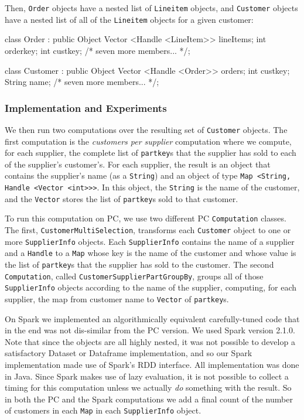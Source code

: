 \noindent Then,
\texttt{Order} objects have a nested list of \texttt{Lineitem} objects, and \texttt{Customer} objects have a nested
list of all of the
\texttt{Lineitem} objects for a given customer:

\begin{codesmall}
class Order : public Object {
   Vector <Handle <LineItem>> lineItems;
   int orderkey;
   int custkey;
   /* seven more members... */};

class Customer : public Object {
   Vector <Handle <Order>> orders;
   int custkey;
   String name;
   /* seven more members... */};
\end{codesmall}

\subsubsection{Implementation and Experiments}
We then run two computations over the resulting set of \texttt{Customer} objects.  
The first computation is the \emph{customers per supplier} computation where we
compute, for each supplier,
the complete list of \texttt{partkey}s that the supplier has sold to each of the supplier's customer's.
For each supplier, the result is an object that contains the supplier's name (as a \texttt{String}) and
an object of type \texttt{Map <String, Handle <Vector <int}\texttt{>}\texttt{>}\texttt{>}.  In this
object, the \texttt{String} is the name of the customer, and the \texttt{Vector} stores the list of
\texttt{partkey}s sold to that customer.

To run this computation on PC, we use two different PC \texttt{Computation} classes.  The first, 
\texttt{Customer}\-\texttt{MultiSelection}, transforms each 
\texttt{Customer} object to one or more
\texttt{SupplierInfo} objects. Each \texttt{SupplierInfo} contains
the name of a supplier
and a \texttt{Handle} to a \texttt{Map} whose key is the name of the customer and whose value is the list
of \texttt{partkey}s that the supplier has sold to the customer.
The second \texttt{Computation}, called
\texttt{CustomerSupplierPartGroupBy},
groups all of those \texttt{SupplierInfo} objects according to the name of the supplier, computing, for each
supplier, the map from customer name to \texttt{Vector} of \texttt{partkey}s.

On Spark we implemented an algorithmically equivalent
carefully-tuned code that in the
end was not dis-similar from the PC
version.  We used
Spark version
2.1.0.
Note that since the objects are all highly nested, it was not possible to develop a satisfactory
Dataset or Dataframe implementation, and so our Spark implementation made use of Spark's RDD interface.  All
implementation was done in Java.  Since Spark makes use of lazy evaluation, it is not possible to collect a timing
for this computation unless we actually \emph{do} something with the result.  So in both the PC and the Spark computations
we add a final count of the number of customers in each \texttt{Map} in each \texttt{SupplierInfo} object.

